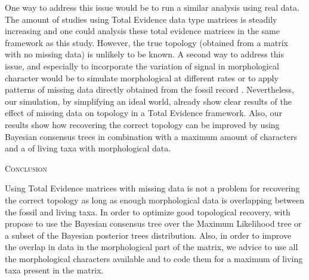 \documentclass[12pt,letterpaper]{article}
\renewcommand{\section}[1]{%
\bigskip
\begin{center}
\begin{Large}
\normalfont\scshape #1
\medskip
\end{Large}
\end{center}}
\begin{document}
One way to address this issue would be to run a similar analysis using real data. The amount of studies using Total Evidence data type matrices is steadily increasing \citep[e.g.][]{ronquista2012,slaterphylogenetic2013,beckancient2014} and one could analysis these total evidence matrices in the same framework as this study. However, the true topology (obtained from a matrix with no missing data) is unlikely to be known. A second way to address this issue, and especially to incorporate the variation of signal in morphological character would be to simulate morphological at different rates \citep{wrightbayesian2014} or to apply patterns of missing data directly obtained from the fossil record \citep{pattinsonphylogeny2014}. Nevertheless, our simulation, by simplifying an ideal world, already show clear results of the effect of missing data on topology in a Total Evidence framework. Also, our results show how recovering the correct topology can be improved by using Bayesian consensus trees in combination with a maximum amount of characters and a of living taxa with morphological data.



%
%

\section{Conclusion} %

Using Total Evidence matrices with missing data is not a problem for recovering the correct topology as long as enough morphological data is overlapping between the fossil and living taxa. In order to optimize good topological recovery, with propose to use the Bayesian consensus tree over the Maximum Likelihood tree or a subset of the Bayesian posterior trees distribution. Also, in order to improve the overlap in data in the morphological part of the matrix, we advice to use all the morphological characters available and to code them for a maximum of living taxa present in the matrix.


%
%
\end{document}

